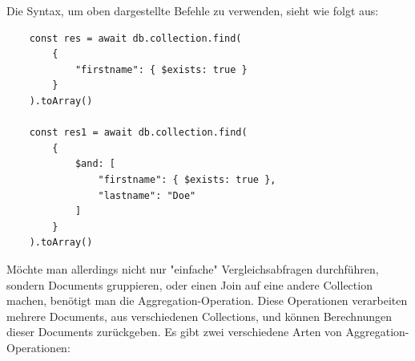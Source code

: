 \cite{mongodb_query_operations}
\newline
Die Syntax, um oben dargestellte Befehle zu verwenden, sieht wie folgt aus:
\newline
\begin{lstlisting}
    const res = await db.collection.find(
        {
            "firstname": { $exists: true }
        }
    ).toArray()

    const res1 = await db.collection.find(
        {
            $and: [
                "firstname": { $exists: true },
                "lastname": "Doe"
            ]
        }
    ).toArray()
\end{lstlisting}
\cite{mongodb_query_basics}
\newline
Möchte man allerdings nicht nur "einfache" Vergleichsabfragen durchführen, sondern Documents gruppieren, oder einen Join auf eine andere Collection machen, benötigt man die Aggregation-Operation. Diese Operationen verarbeiten mehrere Documents, aus verschiedenen Collections, und können Berechnungen dieser Documents zurückgeben. Es gibt zwei verschiedene Arten von Aggregation-Operationen:
